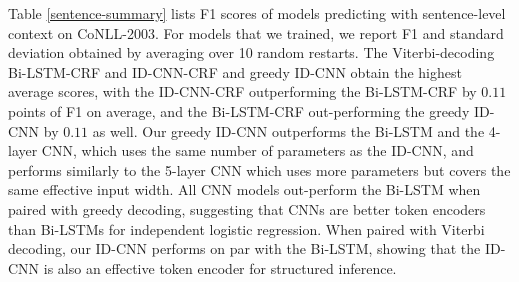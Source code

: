 Table \ref{sentence-summary} lists F1 scores of models predicting with sentence-level context on CoNLL-2003. For models that we trained, we report F1 and standard deviation obtained by averaging over 10 random restarts. The Viterbi-decoding Bi-LSTM-CRF and ID-CNN-CRF and greedy ID-CNN obtain the highest average scores, with the ID-CNN-CRF outperforming the Bi-LSTM-CRF by $0.11$ points of F1 on average, and the Bi-LSTM-CRF out-performing the greedy ID-CNN by $0.11$ as well. Our greedy ID-CNN outperforms the Bi-LSTM and the 4-layer CNN, which uses the same number of parameters as the ID-CNN, and performs similarly to the 5-layer CNN which uses more parameters but covers the same effective input width. All CNN models out-perform the Bi-LSTM when paired with greedy decoding, suggesting that CNNs are better token encoders than Bi-LSTMs for independent logistic regression. When paired with Viterbi decoding, our ID-CNN performs on par with the Bi-LSTM, showing that the ID-CNN is also an effective token encoder for structured inference.

